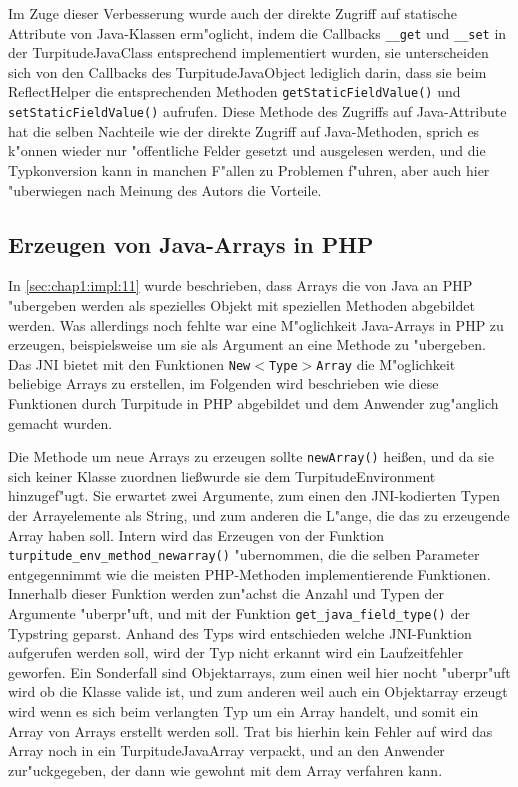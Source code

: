 Im Zuge dieser Verbesserung wurde auch der direkte Zugriff auf statische Attribute von Java-Klassen erm"oglicht, indem die
Callbacks \texttt{\_\_get} und \texttt{\_\_set} in der TurpitudeJavaClass entsprechend implementiert wurden, sie unterscheiden sich
von den Callbacks des TurpitudeJavaObject lediglich darin, dass sie beim ReflectHelper die entsprechenden Methoden
\texttt{getStaticFieldValue()} und \texttt{setStaticFieldValue()} aufrufen.
Diese Methode des Zugriffs auf Java-Attribute hat die selben Nachteile wie der direkte Zugriff auf Java-Methoden, sprich es k"onnen
wieder nur "offentliche Felder gesetzt und ausgelesen werden, und die Typkonversion kann in manchen F"allen zu Problemen f"uhren, aber
auch hier "uberwiegen nach Meinung des Autors die Vorteile.

\subsection{Erzeugen von Java-Arrays in PHP}
\label{sec:chap1:impl:13}

In \ref{sec:chap1:impl:11} wurde beschrieben, dass Arrays die von Java an PHP "ubergeben werden als spezielles Objekt
mit speziellen Methoden abgebildet werden. Was allerdings noch fehlte war eine M"oglichkeit Java-Arrays in PHP zu erzeugen,
beispielsweise um sie als Argument an eine Methode zu "ubergeben. Das JNI bietet mit den Funktionen \texttt{New$<$Type$>$Array}
die M"oglichkeit beliebige Arrays zu erstellen, im Folgenden wird beschrieben wie diese Funktionen durch Turpitude in PHP
abgebildet und dem Anwender zug"anglich gemacht wurden.

Die Methode um neue Arrays zu erzeugen sollte \texttt{newArray()} hei\ss en, und da sie sich keiner Klasse zuordnen lie\ss  wurde 
sie dem TurpitudeEnvironment hinzugef"ugt. Sie erwartet zwei Argumente, zum einen den JNI-kodierten Typen der Arrayelemente 
als String, und zum anderen die L"ange, die das zu erzeugende Array haben soll. Intern wird das Erzeugen von der Funktion
\texttt{turpitude\_env\_method\_newarray()} "ubernommen, die die selben Parameter entgegennimmt wie die meisten PHP-Methoden
implementierende Funktionen. Innerhalb dieser Funktion werden zun"achst die Anzahl und Typen der Argumente "uberpr"uft, und 
mit der Funktion \texttt{get\_java\_field\_type()} der Typstring geparst. Anhand des Typs wird entschieden welche JNI-Funktion
aufgerufen werden soll, wird der Typ nicht erkannt wird ein Laufzeitfehler geworfen. Ein Sonderfall sind Objektarrays, zum einen
weil hier nocht "uberpr"uft wird ob die Klasse valide ist, und zum anderen weil auch ein Objektarray erzeugt wird wenn es sich beim
verlangten Typ um ein Array handelt, und somit ein Array von Arrays erstellt werden soll. Trat bis hierhin kein Fehler auf
wird das Array noch in ein TurpitudeJavaArray verpackt, und an den Anwender zur"uckgegeben, der dann wie gewohnt mit dem Array
verfahren kann.

